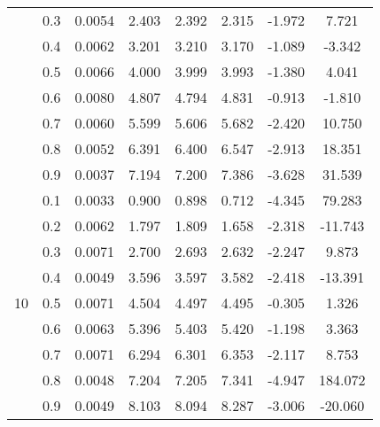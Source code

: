 \documentclass[11pt,a4paper]{report}
\begin{document}
\begin{longtable}{ | c | c || c | c | c | c | c | c | }
 & 0.3 & 0.0054 & 2.403 & 2.392 & 2.315 & -1.972 & 7.721 \\
 & 0.4 & 0.0062 & 3.201 & 3.210 & 3.170 & -1.089 & -3.342 \\
 & 0.5 & 0.0066 & 4.000 & 3.999 & 3.993 & -1.380 & 4.041 \\
 & 0.6 & 0.0080 & 4.807 & 4.794 & 4.831 & -0.913 & -1.810 \\
 & 0.7 & 0.0060 & 5.599 & 5.606 & 5.682 & -2.420 & 10.750 \\
 & 0.8 & 0.0052 & 6.391 & 6.400 & 6.547 & -2.913 & 18.351 \\
 & 0.9 & 0.0037 & 7.194 & 7.200 & 7.386 & -3.628 & 31.539 \\
 \hline
\multirow{9}{*}{10} & 0.1 & 0.0033 & 0.900 & 0.898 & 0.712 & -4.345 & 79.283 \\
 & 0.2 & 0.0062 & 1.797 & 1.809 & 1.658 & -2.318 & -11.743 \\
 & 0.3 & 0.0071 & 2.700 & 2.693 & 2.632 & -2.247 & 9.873 \\
 & 0.4 & 0.0049 & 3.596 & 3.597 & 3.582 & -2.418 & -13.391 \\
 & 0.5 & 0.0071 & 4.504 & 4.497 & 4.495 & -0.305 & 1.326 \\
 & 0.6 & 0.0063 & 5.396 & 5.403 & 5.420 & -1.198 & 3.363 \\
 & 0.7 & 0.0071 & 6.294 & 6.301 & 6.353 & -2.117 & 8.753 \\
 & 0.8 & 0.0048 & 7.204 & 7.205 & 7.341 & -4.947 & 184.072 \\
 & 0.9 & 0.0049 & 8.103 & 8.094 & 8.287 & -3.006 & -20.060 \\
 \hline
\hline
\end{longtable}
\end{document}
